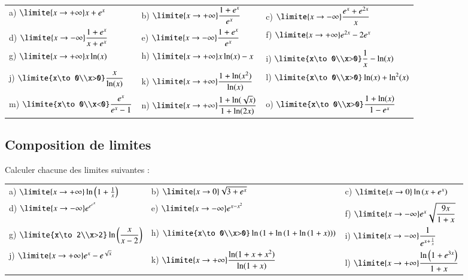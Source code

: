 \documentclass[oneside,12pt]{article}          %
\begin{document}
\renewcommand{\arraystretch}{2}
\begin{tabular}{p{} p{} p{}}
	a) $\limite{x\to+\infty} x+e^x$  &
	b) $\limite{x\to+\infty} \dfrac{1+e^x}{e^x}$ &
	c) $\limite{x\to-\infty} \dfrac{e^x+e^{2x}}{x}$ \\
	d) $\limite{x\to-\infty} \dfrac{1+e^x}{x+e^x}$ &
	e) $\limite{x\to-\infty} \dfrac{1+e^x}{e^x}$ &
	f) $\limite{x\to+\infty} e^{2x}-2e^x$ \\
	g) $\limite{x\to+\infty} x\ln(x)$ &
	h) $\limite{x\to+\infty} x\ln(x)-x$ &
	i) $\limite{x\to0\\x>0} \dfrac{1}{x}-\ln(x) $ \\
	j) $\limite{x\to0\\x>0} \dfrac{x}{\ln(x)}$ &
	k) $\limite{x\to+\infty} \dfrac{1+\ln(x^2)}{\ln(x)}$ &
	l) $\limite{x\to0\\x>0} \ln(x)+\ln^2(x)$ \\
	m) $\limite{x\to0\\x<0} \dfrac{e^x}{e^x-1}$ &
	n) $\limite{x\to+\infty} \dfrac{1+\ln(\sqrt{x})}{1+\ln(2x)}$ &
	o) $\limite{x\to0\\x>0} \dfrac{1+\ln(x)}{1-e^x}$
\end{tabular}



\subsection{Composition de limites}
Calculer chacune des limites suivantes :

\renewcommand{\arraystretch}{2}
\begin{tabular}{p{} p{} p{}}
	a) $\limite{x\to+\infty} \ln\left(1+\frac{1}{x}\right)$  &
	b) $\limite{x\to0} \sqrt{3+e^x}$ &
	c) $\limite{x\to0} \ln\left(x+e^x\right)$ \\
	d) $\limite{x\to-\infty} e^{e^{e^{x}}}$ &
	e) $\limite{x\to-\infty} e^{x-x^2}$ &
	f) $\limite{x\to-\infty} e^x\sqrt{\dfrac{9x}{1+x}}$ \\
	g) $\limite{x\to2\\x>2} \ln\left(\dfrac{x}{x-2}\right)$ &
	h) $\limite{x\to0\\x>0} \ln\left(1+\ln\left(1+\ln\left(1+x\right)\right)\right) $ &
	i) $\limite{x\to-\infty} \dfrac{1}{e^{x+\frac{1}{x}}}$ \\
	j) $\limite{x\to+\infty} e^x-e^{\sqrt{x}}$ &
	k) $\limite{x\to+\infty} \dfrac{\ln(1+x+x^2)}{\ln(1+x)}$ &
	l) $\limite{x\to+\infty} \dfrac{\ln\left(1+e^{3x}\right)}{1+x}$
\end{tabular}
\end{document}
